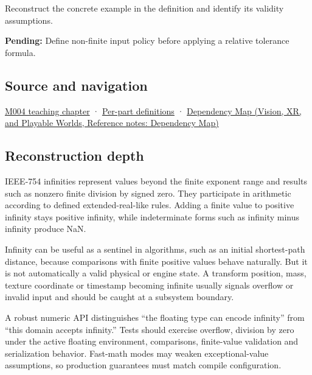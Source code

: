 Reconstruct the concrete example in the definition and identify its validity assumptions.

\textbf{Pending:} Define non-finite input policy before applying a relative tolerance formula.

\subsection{Source and navigation}\label{appendix-eb336149c00a-source-and-navigation}

\hyperref[01-foundations-i-ch001-a-stretching-ruler-for-real-valued-quantities]{M004 teaching chapter} · \hyperref[appendix-fd090d982a15-m004---parts-61-76]{Per-part definitions} · \href{../07-Vision-XR-and-Playable-Worlds/main.pdf\#nameddest=appendix-4ad47bdd269a}{Dependency Map (Vision, XR, and Playable Worlds, Reference notes: Dependency Map)}

\subsection{Reconstruction depth}\label{appendix-eb336149c00a-reconstruction-depth}

IEEE-754 infinities represent values beyond the finite exponent range and results such as nonzero finite division by signed zero. They participate in arithmetic according to defined extended-real-like rules. Adding a finite value to positive infinity stays positive infinity, while indeterminate forms such as infinity minus infinity produce NaN.

Infinity can be useful as a sentinel in algorithms, such as an initial shortest-path distance, because comparisons with finite positive values behave naturally. But it is not automatically a valid physical or engine state. A transform position, mass, texture coordinate or timestamp becoming infinite usually signals overflow or invalid input and should be caught at a subsystem boundary.

A robust numeric API distinguishes ``the floating type can encode infinity'' from ``this domain accepts infinity.'' Tests should exercise overflow, division by zero under the active floating environment, comparisons, finite-value validation and serialization behavior. Fast-math modes may weaken exceptional-value assumptions, so production guarantees must match compile configuration.
